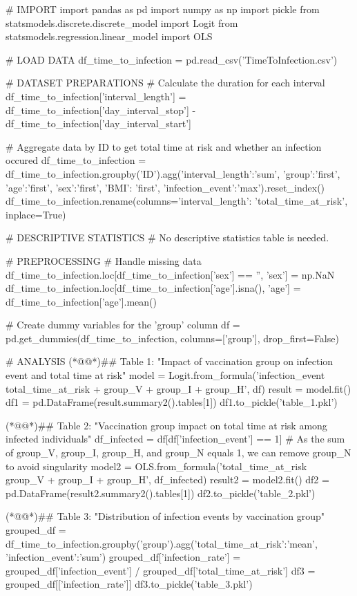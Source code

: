 \documentclass[11pt]{article}
\begin{document}
\begin{python}


# IMPORT
import pandas as pd
import numpy as np
import pickle
from statsmodels.discrete.discrete_model import Logit
from statsmodels.regression.linear_model import OLS

# LOAD DATA
df_time_to_infection = pd.read_csv('TimeToInfection.csv')

# DATASET PREPARATIONS
# Calculate the duration for each interval
df_time_to_infection['interval_length'] = df_time_to_infection['day_interval_stop'] - df_time_to_infection['day_interval_start']

# Aggregate data by ID to get total time at risk and whether an infection occured
df_time_to_infection = df_time_to_infection.groupby('ID').agg({'interval_length':'sum', 'group':'first',
  'age':'first', 'sex':'first', 'BMI': 'first',
  'infection_event':'max'}).reset_index()
df_time_to_infection.rename(columns={'interval_length': 'total_time_at_risk'}, inplace=True)

# DESCRIPTIVE STATISTICS
# No descriptive statistics table is needed.

# PREPROCESSING
# Handle missing data
df_time_to_infection.loc[df_time_to_infection['sex'] == '', 'sex'] = np.NaN
df_time_to_infection.loc[df_time_to_infection['age'].isna(), 'age'] = df_time_to_infection['age'].mean()

# Create dummy variables for the 'group' column 
df = pd.get_dummies(df_time_to_infection, columns=['group'], drop_first=False)

# ANALYSIS
(*@@*)## Table 1: "Impact of vaccination group on infection event and total time at risk"
model = Logit.from_formula('infection_event ~ total_time_at_risk + group_V + group_I + group_H', df)
result = model.fit()
df1 = pd.DataFrame(result.summary2().tables[1])
df1.to_pickle('table_1.pkl')

(*@@*)## Table 2: "Vaccination group impact on total time at risk among infected individuals"
df_infected = df[df['infection_event'] == 1]
# As the sum of group_V, group_I, group_H, and group_N equals 1, we can remove group_N to avoid singularity
model2 = OLS.from_formula('total_time_at_risk ~ group_V + group_I + group_H', df_infected)
result2 = model2.fit()
df2 = pd.DataFrame(result2.summary2().tables[1])
df2.to_pickle('table_2.pkl')

(*@@*)## Table 3: "Distribution of infection events by vaccination group"
grouped_df = df_time_to_infection.groupby('group').agg({'total_time_at_risk':'mean', 'infection_event':'sum'})
grouped_df['infection_rate'] = grouped_df['infection_event'] / grouped_df['total_time_at_risk']
df3 = grouped_df[['infection_rate']]
df3.to_pickle('table_3.pkl')


\end{python}
\end{document}
